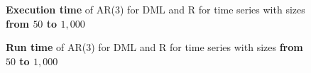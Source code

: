\begin{figure}[ht]
	\centering
	\caption{\textbf{Execution time} of AR(3) for DML and R for time series with sizes \textbf{from $50$ to $1,000$} }
    \label{apx-fig:ar3-exectime-scatter-all_small}
\end{figure}

\begin{figure}[ht]
	\centering
	\caption{\textbf{Run time} of AR(3) for DML and R for time series with sizes \textbf{from $50$ to $1,000$} }
    \label{apx-fig:ar3-runtime-scatter-all_small}
\end{figure}



